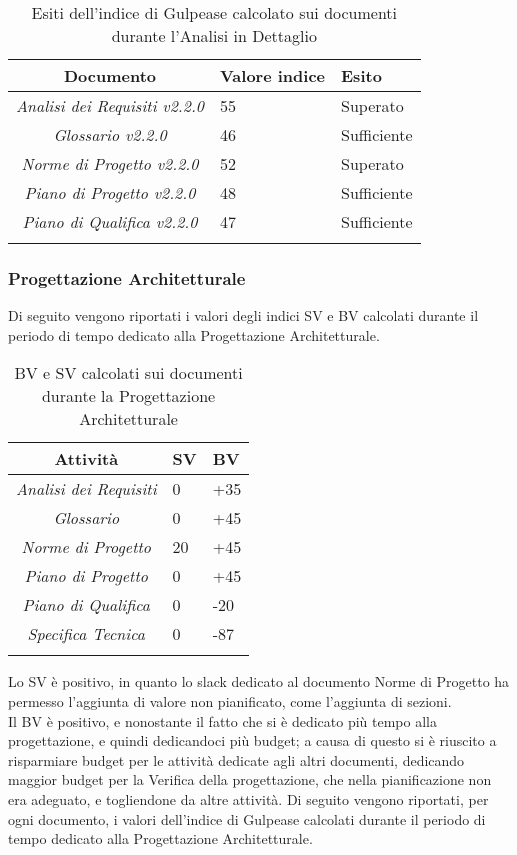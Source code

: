 \begin{longtable}{|c|p{3cm}|p{3cm}|}
\toprule
\textbf{Documento} & \textbf{Valore indice} & \textbf{Esito} \\


\midrule
\midrule
\emph{Analisi dei Requisiti v2.2.0} & 55 & Superato \\
\midrule
\emph{Glossario v2.2.0} & 46 & Sufficiente\\
\midrule
\emph{Norme di Progetto v2.2.0} & 52 & Superato\\
\midrule
\emph{Piano di Progetto v2.2.0} & 48 & Sufficiente \\
\midrule
\emph{Piano di Qualifica v2.2.0} & 47 & Sufficiente \\
\bottomrule
\caption{Esiti dell'indice di Gulpease calcolato sui documenti durante l'Analisi in Dettaglio}
\label{tab:changelog}
\end{longtable}
\subsubsection{Progettazione Architetturale}
Di seguito vengono riportati i valori degli indici SV e BV calcolati durante il periodo di tempo dedicato alla Progettazione Architetturale.
\begin{longtable}{|c|p{3cm}|p{3cm}|}
\toprule
\textbf{Attività} & \textbf{SV} & \textbf{BV} \\


\midrule
\emph{Analisi dei Requisiti} & 0 & +35\\
\midrule
\emph{Glossario} & 0  & +45\\
\midrule
\emph{Norme di Progetto} & 20 & +45\\
\midrule
\emph{Piano di Progetto} & 0 & +45 \\
\midrule
\emph{Piano di Qualifica} & 0 & -20\\
\midrule
\emph{Specifica Tecnica} & 0 & -87\\
\bottomrule
\caption{BV e SV calcolati sui documenti durante la Progettazione Architetturale}
\label{tab:changelog}
\end{longtable}
Lo SV è positivo, in quanto lo slack dedicato al documento Norme di Progetto ha permesso l'aggiunta di valore non pianificato, come l'aggiunta di sezioni.\\
Il BV è positivo, e nonostante il fatto che si è dedicato più tempo alla progettazione, e quindi dedicandoci più budget; a causa di questo si è riuscito a risparmiare budget per le attività dedicate agli altri documenti, dedicando maggior budget per la Verifica della progettazione, che nella pianificazione non era adeguato, e togliendone da altre attività.
Di seguito vengono riportati, per ogni documento, i valori dell'indice di Gulpease calcolati durante il periodo di tempo dedicato alla Progettazione Architetturale.

